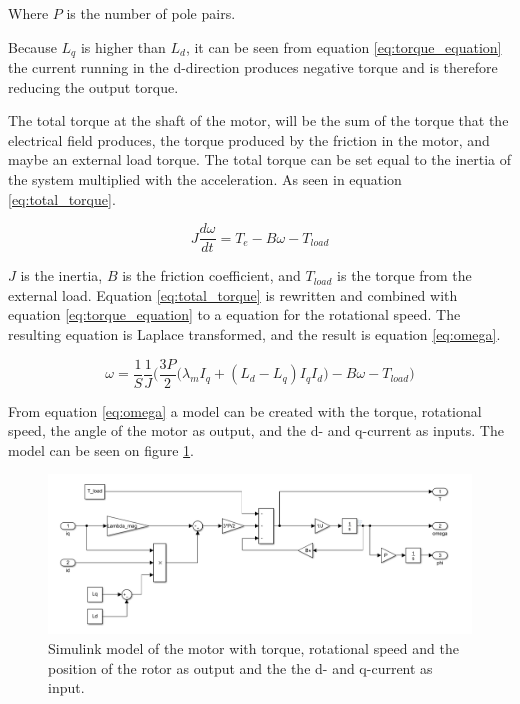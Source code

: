 Where $P$ is the number of pole pairs.

Because $L_q$ is higher than $L_d$, it can be seen from equation \ref{eq:torque_equation} the current running in the d-direction produces negative torque and is therefore reducing the output torque. 

The total torque at the shaft of the motor, will be the sum of the torque that the electrical field produces, the torque produced by the friction in the motor, and maybe an external load torque. The total torque can be set equal to the inertia of the system multiplied with the acceleration. As seen in equation \ref{eq:total_torque}.

\begin{equation}
    \label{eq:total_torque}
    J\frac{d\omega}{dt} = T_e - B\omega - T_{load}
\end{equation}

$J$ is the inertia, $B$ is the friction coefficient, and $T_{load}$ is the torque from the external load.
Equation \ref{eq:total_torque} is rewritten and combined with equation \ref{eq:torque_equation} to a equation for the rotational speed. The resulting equation is Laplace transformed, and the result is equation \ref{eq:omega}.

\begin{equation}
    \label{eq:omega}
    \omega = \frac{1}{S} \frac{1}{J} \bigg( \frac{3P}{2} \big( \lambda_m I_q + (L_d - L_q) I_q I_d \big) - B\omega - T_{load} \bigg)
\end{equation}

From equation \ref{eq:omega} a model can be created with the torque, rotational speed, the angle of the motor as output, and the d- and q-current as inputs. The model can be seen on figure \ref{fig:torque_model}.

\begin{figure}[H]
	\centering
	\includegraphics[width=1\linewidth]{pictures/control/torque.PNG}
	\caption{Simulink model of the motor with torque, rotational speed and the position of the rotor as output and the the d- and q-current as input.}
	\label{fig:torque_model}
\end{figure}

